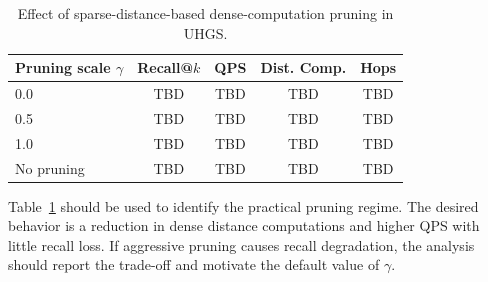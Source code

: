 \begin{table}[t]
\centering
\caption{Effect of sparse-distance-based dense-computation pruning in UHGS.}
\label{tab:pruning-study}
\begin{tabular}{lcccc}
\hline
Pruning scale $\gamma$ & Recall@$k$ & QPS & Dist. Comp. & Hops \\
\hline
0.0 & TBD & TBD & TBD & TBD \\
0.5 & TBD & TBD & TBD & TBD \\
1.0 & TBD & TBD & TBD & TBD \\
No pruning & TBD & TBD & TBD & TBD \\
\hline
\end{tabular}
\end{table}

Table~\ref{tab:pruning-study} should be used to identify the practical pruning regime. The desired behavior is a reduction in dense distance computations and higher QPS with little recall loss. If aggressive pruning causes recall degradation, the analysis should report the trade-off and motivate the default value of $\gamma$.
